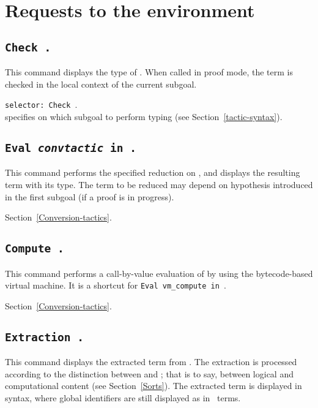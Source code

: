 \section{Requests to the environment}

\subsection[\tt Check {\term}.]{\tt Check {\term}.\label{Check}
}
This command displays the type of {\term}. When called in proof mode, 
the term is checked in the local context of the current subgoal.

\begin{Variants}
\item {\tt selector: Check {\term}}.\\
specifies on which subgoal to perform typing (see
  Section~\ref{tactic-syntax}).
\end{Variants}


\subsection[\tt Eval {\rm\sl convtactic} in {\term}.]{\tt Eval {\rm\sl convtactic} in {\term}.}

This command performs the specified reduction on {\term}, and displays
the resulting term with its type. The term to be reduced may depend on
hypothesis introduced in the first subgoal (if a proof is in
progress).

\SeeAlso Section~\ref{Conversion-tactics}.

\subsection[\tt Compute {\term}.]{\tt Compute {\term}.}

This command performs a call-by-value evaluation of {\term} by using
the bytecode-based virtual machine. It is a shortcut for
{\tt Eval vm\_compute in {\term}}.

\SeeAlso Section~\ref{Conversion-tactics}.

\subsection[\tt Extraction \term.]{\tt Extraction \term.\label{ExtractionTerm}
} 
This command displays the extracted term from
{\term}. The extraction is processed according to the distinction
between {\Set} and {\Prop}; that is to say, between logical and
computational content (see Section~\ref{Sorts}). The extracted term is
displayed in {\ocaml} syntax, where global identifiers are still
displayed as in \Coq\ terms.

